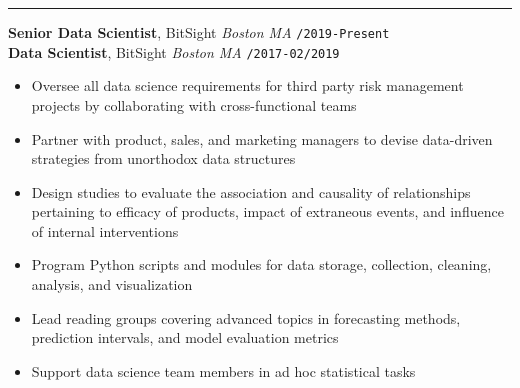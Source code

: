 \documentclass[10pt,english]{report}
\begin{document}
\vspace{5mm}

{\par}
\vspace{1mm}\hrule
\vspace{1mm}

\textbf{Senior Data Scientist}, BitSight \hfill \textit{Boston MA} \texttt{/2019-Present} \\
\textbf{Data Scientist}, BitSight \hfill \textit{Boston MA} \texttt{/2017-02/2019}
\begin{itemize}
\item Oversee all data science requirements for third party risk management projects by collaborating with cross-functional teams
\item Partner with product, sales, and marketing managers to devise data-driven strategies from unorthodox data structures
\item Design studies to evaluate the association and causality of relationships pertaining to efficacy of products, impact of extraneous events, and influence of internal interventions
\item Program Python scripts and modules for data storage, collection, cleaning, analysis, and visualization
\item Lead reading groups covering advanced topics in forecasting methods, prediction intervals, and model evaluation metrics
\item Support data science team members in ad hoc statistical tasks
\end{itemize}

\vspace{1mm}
\end{document}
